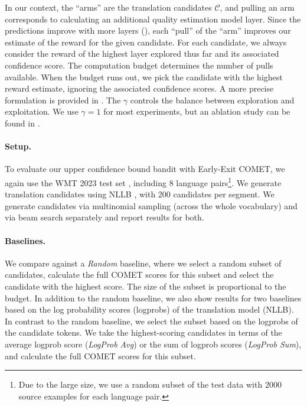 In our context, the ``arms'' are the translation candidates $\mathcal{C}$, and pulling an arm corresponds to calculating an additional quality estimation model layer.
Since the predictions improve with more layers (), each ``pull'' of the ``arm'' improves our estimate of the reward for the given candidate.
For each candidate, we always consider the reward of the highest layer explored thus far and its associated confidence score.
The computation budget determines the number of pulls available. When the budget runs out, we pick the candidate with the highest reward estimate, ignoring the associated confidence scores. 
A more precise formulation is provided in .
The $\gamma$ controls the balance between exploration and exploitation. We use $\gamma=1$ for most experiments, but an ablation study can be found in .

\paragraph{Setup.}
To evaluate our upper confidence bound bandit with Early-Exit COMET, we again use the WMT 2023 test set \citep{kocmi-etal-2023-findings}, including 8 language pairs\footnote{Due to the large size, we use a random subset of the test data with $2000$ source examples for each language pair.}. We generate translation candidates using NLLB \citep{nllb2022}, with 200 candidates per segment. We generate candidates via multinomial sampling (across the whole vocabulary) and via beam search separately and report results for both.


\paragraph{Baselines.}
We compare against a \textit{Random} baseline, where we select a random subset of candidates, calculate the full COMET scores for this subset and select the candidate with the highest score. The size of the subset is proportional to the budget.
In addition to the random baseline, we also show results for two baselines based on the log probability scores (logprobs) of the translation model (NLLB).
In contrast to the random baseline, we select the subset based on the logprobs of the candidate tokens. We take the highest-scoring candidates in terms of the average logprob score (\textit{LogProb Avg}) or the sum of logprob scores (\textit{LogProb Sum}), and calculate the full COMET scores for this subset.





